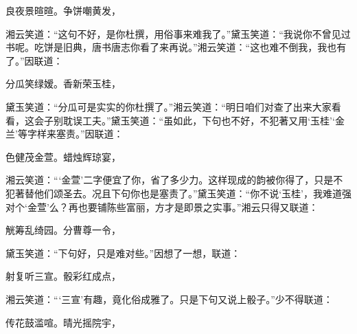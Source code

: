 \begin{poem}
    \begin{pl}
        良夜景暄暄。争饼嘲黄发，
    \end{pl}
\end{poem}
\begin{parag}

    湘云笑道：“这句不好，是你杜撰，用俗事来难我了。”黛玉笑道：“我说你不曾见过书呢。吃饼是旧典，唐书唐志你看了来再说。”湘云笑道：“这也难不倒我，我也有了。”因联道：
\end{parag}

\begin{poem}
    \begin{pl}
        分瓜笑绿嫒。香新荣玉桂，
    \end{pl}
\end{poem}
\begin{parag}
    黛玉笑道：“分瓜可是实实的你杜撰了。”湘云笑道：“明日咱们对查了出来大家看看，这会子别耽误工夫。”黛玉笑道：“虽如此，下句也不好，不犯著又用‘玉桂’‘金兰’等字样来塞责。”因联道：
\end{parag}

\begin{poem}
    \begin{pl}
        色健茂金萱。蜡烛辉琼宴，
    \end{pl}
\end{poem}
\begin{parag}

    湘云笑道：“‘金萱’二字便宜了你，省了多少力。这样现成的韵被你得了，只是不犯著替他们颂圣去。况且下句你也是塞责了。”黛玉笑道：“你不说‘玉桂’，我难道强对个‘金萱’么？再也要铺陈些富丽，方才是即景之实事。”湘云只得又联道：
\end{parag}

\begin{poem}
    \begin{pl}
        觥筹乱绮园。分曹尊一令，
    \end{pl}
\end{poem}
\begin{parag}

    黛玉笑道：“下句好，只是难对些。”因想了一想，联道：
\end{parag}
\begin{poem}
    \begin{pl}
        射复听三宣。骰彩红成点，

    \end{pl}
\end{poem}
\begin{parag}

    湘云笑道：“‘三宣’有趣，竟化俗成雅了。只是下句又说上骰子。”少不得联道：
\end{parag}
\begin{poem}
    \begin{pl}

        传花鼓滥喧。晴光摇院宇，

    \end{pl}
\end{poem}

